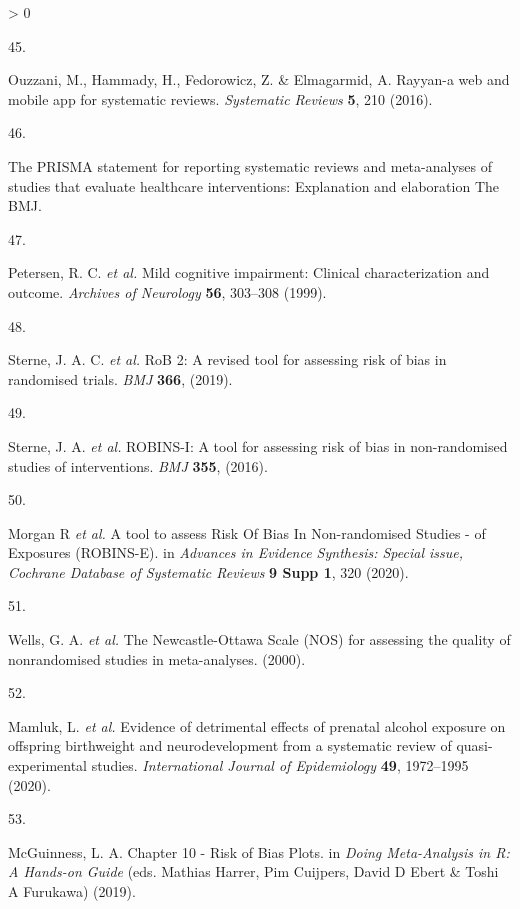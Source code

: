 \documentclass[a4paper, twoside]{templates/ociamthesis}
\newlength{\cslhangindent}
\newlength{\csllabelwidth}
\newenvironment{CSLReferences}[3] %
 {%
  \setlength{\parindent}{0pt}
  \ifodd #1 \everypar{\setlength{\hangindent}{\cslhangindent}}\ignorespaces\fi
  \ifnum #2 > 0
  \setlength{\parskip}{#2\baselineskip}
  \fi
 }%
 {}
\newcommand{\CSLLeftMargin}[1]{\parbox[t]{\maxof{\widthof{#1}}{\csllabelwidth}}{#1}}
\newcommand{\CSLRightInline}[1]{\parbox[t]{\linewidth - \csllabelwidth}{#1}}
\begin{document}
\begin{CSLReferences}{0}{0}
\leavevmode\hypertarget{ref-ouzzani2016}{}%
\CSLLeftMargin{45. }
\CSLRightInline{Ouzzani, M., Hammady, H., Fedorowicz, Z. \& Elmagarmid, A. Rayyan-a web and mobile app for systematic reviews. \emph{Systematic Reviews} \textbf{5}, 210 (2016).}

\leavevmode\hypertarget{ref-zotero-766}{}%
\CSLLeftMargin{46. }
\CSLRightInline{The {PRISMA} statement for reporting systematic reviews and meta-analyses of studies that evaluate healthcare interventions: Explanation and elaboration \textbar{} {The BMJ}.}

\leavevmode\hypertarget{ref-petersen1999}{}%
\CSLLeftMargin{47. }
\CSLRightInline{Petersen, R. C. \emph{et al.} Mild cognitive impairment: Clinical characterization and outcome. \emph{Archives of Neurology} \textbf{56}, 303--308 (1999).}

\leavevmode\hypertarget{ref-sterne2019}{}%
\CSLLeftMargin{48. }
\CSLRightInline{Sterne, J. A. C. \emph{et al.} {RoB} 2: A revised tool for assessing risk of bias in randomised trials. \emph{BMJ} \textbf{366}, (2019).}

\leavevmode\hypertarget{ref-sterne2016}{}%
\CSLLeftMargin{49. }
\CSLRightInline{Sterne, J. A. \emph{et al.} {ROBINS}-{I}: A tool for assessing risk of bias in non-randomised studies of interventions. \emph{BMJ} \textbf{355}, (2016).}

\leavevmode\hypertarget{ref-morganr2020}{}%
\CSLLeftMargin{50. }
\CSLRightInline{Morgan R \emph{et al.} A tool to assess {Risk Of Bias In Non}-randomised {Studies} - of {Exposures} ({ROBINS}-{E}). in \emph{Advances in {Evidence Synthesis}: Special issue, {Cochrane Database} of {Systematic Reviews}} \textbf{9 Supp 1}, 320 (2020).}

\leavevmode\hypertarget{ref-wells2000newcastle}{}%
\CSLLeftMargin{51. }
\CSLRightInline{Wells, G. A. \emph{et al.} The {Newcastle}-{Ottawa Scale} ({NOS}) for assessing the quality of nonrandomised studies in meta-analyses. (2000).}

\leavevmode\hypertarget{ref-mamluk2020}{}%
\CSLLeftMargin{52. }
\CSLRightInline{Mamluk, L. \emph{et al.} Evidence of detrimental effects of prenatal alcohol exposure on offspring birthweight and neurodevelopment from a systematic review of quasi-experimental studies. \emph{International Journal of Epidemiology} \textbf{49}, 1972--1995 (2020).}

\leavevmode\hypertarget{ref-mcguinness2019}{}%
\CSLLeftMargin{53. }
\CSLRightInline{McGuinness, L. A. Chapter 10 - {Risk} of {Bias Plots}. in \emph{Doing {Meta}-{Analysis} in {R}: {A Hands}-on {Guide}} (eds. Mathias Harrer, Pim Cuijpers, David D Ebert \& Toshi A Furukawa) (2019).}


\end{CSLReferences}
\end{document}
